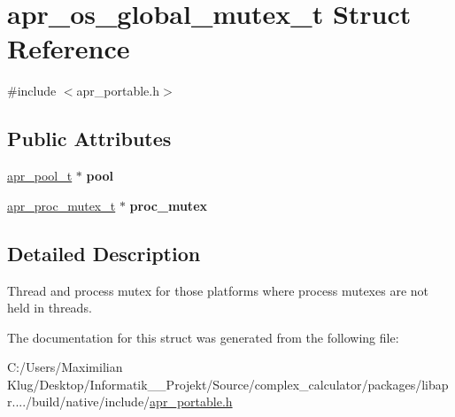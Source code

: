 \hypertarget{structapr__os__global__mutex__t}{}\section{apr\+\_\+os\+\_\+global\+\_\+mutex\+\_\+t Struct Reference}
\label{structapr__os__global__mutex__t}


{\ttfamily \#include $<$apr\+\_\+portable.\+h$>$}

\subsection*{Public Attributes}
\begin{DoxyCompactItemize}
\item 
\mbox{\label{structapr__os__global__mutex__t_a13624705c6a07c55db295d2bfe2f94a9}} 
\mbox{\hyperlink{group__apr__pools_gaf137f28edcf9a086cd6bc36c20d7cdfb}{apr\+\_\+pool\+\_\+t}} $\ast$ {\bfseries pool}
\item 
\mbox{\label{structapr__os__global__mutex__t_aec060b8739b0d1b42360424216bbf399}} 
\mbox{\hyperlink{structapr__proc__mutex__t}{apr\+\_\+proc\+\_\+mutex\+\_\+t}} $\ast$ {\bfseries proc\+\_\+mutex}
\end{DoxyCompactItemize}


\subsection{Detailed Description}
Thread and process mutex for those platforms where process mutexes are not held in threads. 

The documentation for this struct was generated from the following file\+:\begin{DoxyCompactItemize}
\item 
C\+:/\+Users/\+Maximilian Klug/\+Desktop/\+Informatik\+\_\+\_\+\+Projekt/\+Source/complex\+\_\+calculator/packages/libapr..../build/native/include/\mbox{\hyperlink{apr__portable_8h}{apr\+\_\+portable.\+h}}\end{DoxyCompactItemize}

